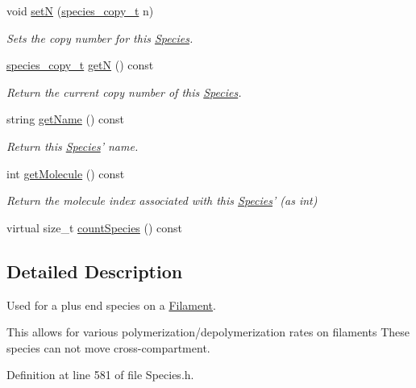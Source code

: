 \begin{DoxyCompactItemize}
void \hyperlink{classSpecies_a88de7cf5130cb9cee2da3585374db654}{set\+N} (\hyperlink{common_8h_a3503f321fd36304ee274141275cca586}{species\+\_\+copy\+\_\+t} n)
\begin{DoxyCompactList}\small\item\em Sets the copy number for this \hyperlink{classSpecies}{Species}. \end{DoxyCompactList}\item 
\hyperlink{common_8h_a3503f321fd36304ee274141275cca586}{species\+\_\+copy\+\_\+t} \hyperlink{classSpecies_aea7327b3fed261c705b4d32b9973aa58}{get\+N} () const 
\begin{DoxyCompactList}\small\item\em Return the current copy number of this \hyperlink{classSpecies}{Species}. \end{DoxyCompactList}\item 
string \hyperlink{classSpecies_a28fa239dded841133760ff9c47af63a1}{get\+Name} () const 
\begin{DoxyCompactList}\small\item\em Return this \hyperlink{classSpecies}{Species}' name. \end{DoxyCompactList}\item 
int \hyperlink{classSpecies_a1ea8969c51bc69879891a408f9e197c7}{get\+Molecule} () const 
\begin{DoxyCompactList}\small\item\em Return the molecule index associated with this \hyperlink{classSpecies}{Species}' (as int) \end{DoxyCompactList}\item 
virtual size\+\_\+t \hyperlink{classSpecies_a1864e111fe0304ca8d6b2d0d955a7356}{count\+Species} () const 
\end{DoxyCompactItemize}


\subsection{Detailed Description}
Used for a plus end species on a \hyperlink{classFilament}{Filament}. 

This allows for various polymerization/depolymerization rates on filaments These species can not move cross-\/compartment. 

Definition at line 581 of file Species.\+h.



